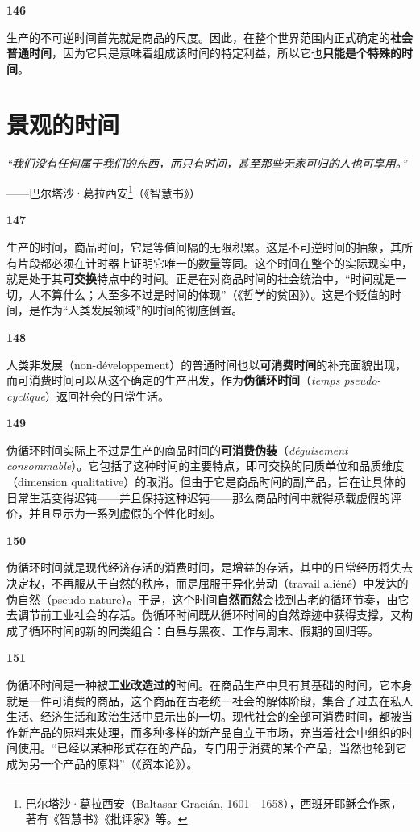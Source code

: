 \documentclass[fontset=fandol, a4paper, 12pt, openright]{ctexbook}
\makeatletter
\renewenvironment{quote}
  {\list{}{\rightmargin\leftmargin}%
   \item\relax\small\itshape\color{darkgray}}
  {\endlist}
\newcommand{\thesis}[1]{%
    \par\vspace{1.5em}%
    {\centering \textbf{\Large #1}\par}%
    \nobreak\vspace{0.5em}\nobreak
    \@afterindenttrue %
    \@afterheading    %
}
\makeatother
\begin{document}
\thesis{146}
生产的不可逆时间首先就是商品的尺度。因此，在整个世界范围内正式确定的\textbf{社会普通时间}，因为它只是意味着组成该时间的特定利益，所以它也\textbf{只能是个特殊的时间}。

\chapter{景观的时间}

\begin{quote}
“我们没有任何属于我们的东西，而只有时间，甚至那些无家可归的人也可享用。”

\begin{flushright}
——巴尔塔沙·葛拉西安\footnote{巴尔塔沙·葛拉西安（Baltasar Gracián, 1601—1658），西班牙耶稣会作家，著有《智慧书》《批评家》等。}（《智慧书》）
\end{flushright}
\end{quote}

\thesis{147}
生产的时间，商品时间，它是等值间隔的无限积累。这是不可逆时间的抽象，其所有片段都必须在计时器上证明它唯一的数量等同。这个时间在整个的实际现实中，就是处于其\textbf{可交换}特点中的时间。正是在对商品时间的社会统治中，“时间就是一切，人不算什么；人至多不过是时间的体现”（《哲学的贫困》）。这是个贬值的时间，是作为“人类发展领域”的时间的彻底倒置。

\thesis{148}
人类非发展（non-développement）的普通时间也以\textbf{可消费时间}的补充面貌出现，而可消费时间可以从这个确定的生产出发，作为\textbf{伪循环时间}（\textit{temps pseudo-cyclique}）返回社会的日常生活。

\thesis{149}
伪循环时间实际上不过是生产的商品时间的\textbf{可消费伪装}（\textit{déguisement consommable}）。它包括了这种时间的主要特点，即可交换的同质单位和品质维度（dimension qualitative）的取消。但由于它是商品时间的副产品，旨在让具体的日常生活变得迟钝——并且保持这种迟钝——那么商品时间中就得承载虚假的评价，并且显示为一系列虚假的个性化时刻。

\thesis{150}
伪循环时间就是现代经济存活的消费时间，是增益的存活，其中的日常经历将失去决定权，不再服从于自然的秩序，而是屈服于异化劳动（travail aliéné）中发达的伪自然（pseudo-nature）。于是，这个时间\textbf{自然而然}会找到古老的循环节奏，由它去调节前工业社会的存活。伪循环时间既从循环时间的自然踪迹中获得支撑，又构成了循环时间的新的同类组合：白昼与黑夜、工作与周末、假期的回归等。

\thesis{151}
伪循环时间是一种被\textbf{工业改造过的}时间。在商品生产中具有其基础的时间，它本身就是一件可消费的商品，这个商品在古老统一社会的解体阶段，集合了过去在私人生活、经济生活和政治生活中显示出的一切。现代社会的全部可消费时间，都被当作新产品的原料来处理，而多种多样的新产品自立于市场，充当着社会中组织的时间使用。“已经以某种形式存在的产品，专门用于消费的某个产品，当然也轮到它成为另一个产品的原料”（《资本论》）。
\end{document}
